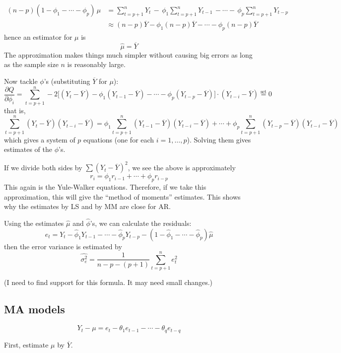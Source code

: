\documentclass[12pt]{article}
\begin{document}
\[\begin{split}
(n-p)(1 - \phi_1 - \dotsb - \phi_p) \, \mu
&= \sum_{t=p+1}^n Y_t \,-\, \phi_1 \sum_{t=p+1}^n Y_{t-1} \,- \dotsb -\,
    \phi_p  \sum_{t=p+1}^n Y_{t-p}
\\
&\approx
    (n-p)\overline{Y} - \phi_1 (n-p)\overline{Y} -\dotsb-
        \phi_p(n-p)\overline{Y}
\end{split}
\]
hence an estimator for $\mu$ is
\[
\hat{\mu} = \overline{Y}
\]
The approximation makes things much simpler without causing big errors
as long as the sample size $n$ is reasonably large.

Now tackle $\phi$'s (substituting $\overline{Y}$ for $\mu$):
\[
\frac{\partial Q}{\partial \phi_i}
=
  \sum_{t=p+1}^n
    -2\bigl[(Y_t - \overline{Y}) - \phi_1(Y_{t-1} - \overline{Y})
        - \dotsb - \phi_p(Y_{t-p} - \overline{Y})\bigr]
    \cdot (Y_{t-i} - \overline{Y})
\overset{\text{set}}{=}
0
\]
that is,
\[
\sum_{t=p+1}^n (Y_t - \overline{Y})(Y_{t-i} - \overline{Y})
=
  \phi_1 \sum_{t=p+1}^n (Y_{t-1} - \overline{Y}) (Y_{t-i} - \overline{Y})
  +\dotsb+
  \phi_p \sum_{t=p+1}^n (Y_{t-p} - \overline{Y}) (Y_{t-i} - \overline{Y})
\]
which gives a system of $p$ equations (one for each $i=1,\dotsc,p$).
Solving them gives estimates of the $\phi$'s.

If we divide both sides by
$\sum (Y_t - \overline{Y})^2$, we see the above is approximately
\[
r_i = \phi_1 r_{i-1} +\dotsb+ \phi_p r_{i-p}
\]
This again is the Yule-Walker equations.
Therefore, if we take this approximation,
this will give the ``method of moments'' estimates.
This shows why the estimates by LS and by MM are close for AR.

Using the estimates $\hat{\mu}$ and $\hat{\phi}$'s,
we can calculate the residuals:
\[
e_t = Y_t - \hat{\phi}_1 Y_{t-1} - \dotsb - \hat{\phi}_p Y_{t-p}
    - (1 - \hat{\phi}_1 - \dotsb - \hat{\phi}_p) \hat{\mu}
\]
then the error variance is estimated by
\[
\hat{\sigma^2_e}
= \frac{1}{n - p - (p + 1)} \sum_{t=p+1}^n {e}_t^2
\]

(I need to find support for this formula. It may need small changes.)

\subsection{MA models}

\[
Y_t - \mu = e_t - \theta_1 e_{t-1} - \dotsb - \theta_q e_{t-q}
\]

First, estimate $\mu$ by $\overline{Y}$.
\end{document}

